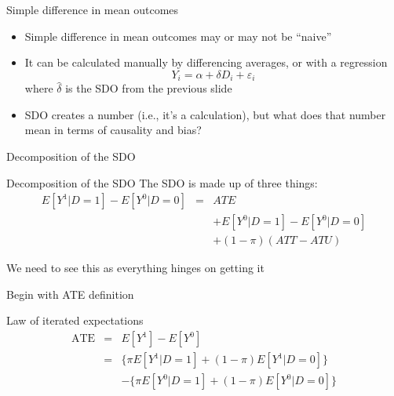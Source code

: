\documentclass{beamer}
\begin{document}
\begin{frame}{Simple difference in mean outcomes}

  \begin{itemize}
    \item Simple difference in mean outcomes may or may not be ``naive''
    \item It can be calculated manually by differencing averages, or with a regression $$Y_i = \alpha + \delta D_i + \varepsilon_{i}$$where $\widehat{\delta}$ is the SDO from the previous slide
    \item SDO creates a number (i.e., it's a calculation), but what does that number mean in terms of causality and bias?
  \end{itemize}

\end{frame}


\begin{frame}{Decomposition of the SDO}

  \begin{block}{Decomposition of the SDO}
    The SDO is made up of three things:
    \begin{eqnarray*}
      E[Y^1 | D=1] - E[Y^0 | D=0]&=& ATE\nonumber \\
      &&+ E[Y^0|D=1] - E[Y^0|D=0] \nonumber \\
      && + (1-\pi)(ATT - ATU)
    \end{eqnarray*}
  \end{block}

\bigskip

We need to see this as everything hinges on getting it
\end{frame}


\begin{frame}{Begin with ATE definition}

  \begin{block}{Law of iterated expectations}
    \begin{eqnarray*}
      \text{ATE}&=&E[Y^1]-E[Y^0]  \\
      &=& \{\pi E[Y^1 | D=1] + (1-\pi)E[Y^1 | D=0]\}  \\
      & & - \{\pi E[Y^0|D=1] + (1-\pi) E[Y^0 | D=0]\}
    \end{eqnarray*}
  \end{block}



\end{frame}
\end{document}
